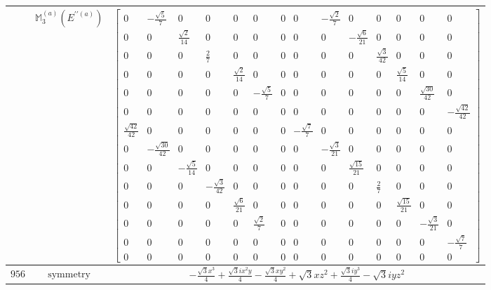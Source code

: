 \documentclass[fleqn,8pt,landscape]{jsarticle}
\begin{document}
\begin{longtable}{ccc}
$  $ & $ \mathbb{M}_{3}^{(a)}(E^{\prime\prime(a)}) $ & $ \begin{bmatrix} 0 & - \frac{\sqrt{5}}{7} & 0 & 0 & 0 & 0 & 0 & 0 & - \frac{\sqrt{2}}{7} & 0 & 0 & 0 & 0 & 0 \\ 0 & 0 & \frac{\sqrt{2}}{14} & 0 & 0 & 0 & 0 & 0 & 0 & - \frac{\sqrt{6}}{21} & 0 & 0 & 0 & 0 \\ 0 & 0 & 0 & \frac{2}{7} & 0 & 0 & 0 & 0 & 0 & 0 & \frac{\sqrt{3}}{42} & 0 & 0 & 0 \\ 0 & 0 & 0 & 0 & \frac{\sqrt{2}}{14} & 0 & 0 & 0 & 0 & 0 & 0 & \frac{\sqrt{5}}{14} & 0 & 0 \\ 0 & 0 & 0 & 0 & 0 & - \frac{\sqrt{5}}{7} & 0 & 0 & 0 & 0 & 0 & 0 & \frac{\sqrt{30}}{42} & 0 \\ 0 & 0 & 0 & 0 & 0 & 0 & 0 & 0 & 0 & 0 & 0 & 0 & 0 & - \frac{\sqrt{42}}{42} \\ \frac{\sqrt{42}}{42} & 0 & 0 & 0 & 0 & 0 & 0 & - \frac{\sqrt{7}}{7} & 0 & 0 & 0 & 0 & 0 & 0 \\ 0 & - \frac{\sqrt{30}}{42} & 0 & 0 & 0 & 0 & 0 & 0 & - \frac{\sqrt{3}}{21} & 0 & 0 & 0 & 0 & 0 \\ 0 & 0 & - \frac{\sqrt{5}}{14} & 0 & 0 & 0 & 0 & 0 & 0 & \frac{\sqrt{15}}{21} & 0 & 0 & 0 & 0 \\ 0 & 0 & 0 & - \frac{\sqrt{3}}{42} & 0 & 0 & 0 & 0 & 0 & 0 & \frac{2}{7} & 0 & 0 & 0 \\ 0 & 0 & 0 & 0 & \frac{\sqrt{6}}{21} & 0 & 0 & 0 & 0 & 0 & 0 & \frac{\sqrt{15}}{21} & 0 & 0 \\ 0 & 0 & 0 & 0 & 0 & \frac{\sqrt{2}}{7} & 0 & 0 & 0 & 0 & 0 & 0 & - \frac{\sqrt{3}}{21} & 0 \\ 0 & 0 & 0 & 0 & 0 & 0 & 0 & 0 & 0 & 0 & 0 & 0 & 0 & - \frac{\sqrt{7}}{7} \\ 0 & 0 & 0 & 0 & 0 & 0 & 0 & 0 & 0 & 0 & 0 & 0 & 0 & 0 \end{bmatrix} $ \\ \hline
$ 956 $ & $ \text{symmetry} $ & $ - \frac{\sqrt{3} x^{3}}{4} + \frac{\sqrt{3} i x^{2} y}{4} - \frac{\sqrt{3} x y^{2}}{4} + \sqrt{3} x z^{2} + \frac{\sqrt{3} i y^{3}}{4} - \sqrt{3} i y z^{2} $ \\

\end{longtable}
\end{document}
